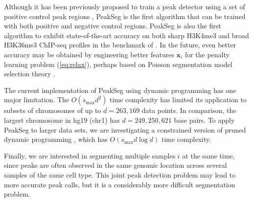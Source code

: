 \documentclass{article}
\begin{document}
Although it has been previously proposed to train a peak detector
using a set of positive control peak regions \citep{DFilter}, PeakSeg
is the first algorithm that can be trained with both positive and
negative control regions. PeakSeg is also the first algorithm to
exhibit state-of-the-art accuracy on both sharp H3K4me3 and broad
H3K36me3 ChIP-seq profiles in the benchmark of
\citet{hocking2014visual}. In the future, even better accuracy may be
obtained by engineering better features $\mathbf x_i$ for the penalty
learning problem (\ref{eq:relax}), perhaps based on Poisson
segmentation model selection theory \citep{cleynen2013segmentation}.

The current implementation of PeakSeg using dynamic programming has
one major limitation. The $O(s_{\text{max}} d^2)$ time complexity has
limited its application to subsets of chromosomes of up to $d=263,169$
data points. In comparison, the largest chromosome in hg19 (chr1) has
$d=249,250,621$ base pairs. To apply PeakSeg to larger data sets, we
are investigating a constrained version of pruned dynamic programming
\citep{pruned-dp, Segmentor}, which has $O(s_{\text{max}} d\log d)$
time complexity.

Finally, we are interested in segmenting multiple samples $i$ at the
same time, since peaks are often observed in the same genomic location
across several samples of the same cell type. This joint peak
detection problem may lead to more accurate peak calls, but it is a
considerably more difficult segmentation problem.





\end{document}
